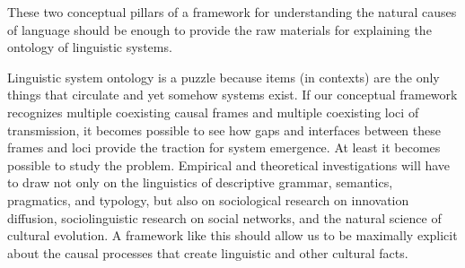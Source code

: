 These two conceptual pillars of a framework for understanding the natural causes of language should be enough to provide the raw materials for explaining the ontology of linguistic systems. 

Linguistic system ontology is a puzzle because items (in contexts) are the only things that circulate and yet somehow systems exist. If our conceptual framework recognizes multiple coexisting causal frames and multiple coexisting loci of transmission, it becomes possible to see how gaps and interfaces between these frames and loci provide the traction for system emergence. At least it becomes possible to study the problem. Empirical and theoretical investigations will have to draw not only on the linguistics of descriptive grammar, semantics, pragmatics, and typology, but also on sociological research on innovation diffusion, sociolinguistic research on social networks, and the natural science of cultural evolution. A framework like this should allow us to be maximally explicit about the causal processes that create linguistic and other cultural facts.


